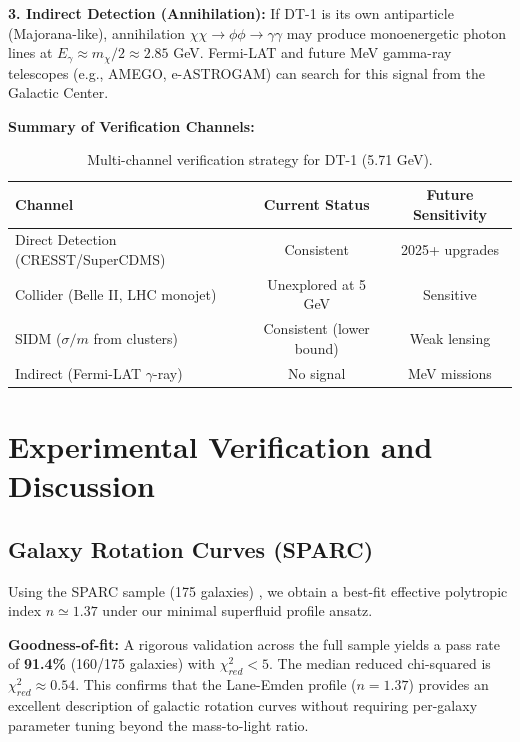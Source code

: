 \documentclass[a4paper,12pt]{article}
\begin{document}
\textbf{3. Indirect Detection (Annihilation):}
If DT-1 is its own antiparticle (Majorana-like), annihilation $\chi\chi \to \phi\phi \to \gamma\gamma$ may produce monoenergetic photon lines at $E_\gamma \approx m_\chi / 2 \approx 2.85$ GeV. Fermi-LAT and future MeV gamma-ray telescopes (e.g., AMEGO, e-ASTROGAM) can search for this signal from the Galactic Center.

\textbf{Summary of Verification Channels:}
\begin{table}[H]
\centering
\small
\begin{tabular}{lcc}
\toprule
\textbf{Channel} & \textbf{Current Status} & \textbf{Future Sensitivity} \\
\midrule
Direct Detection (CRESST/SuperCDMS) & Consistent & 2025+ upgrades \\
Collider (Belle II, LHC monojet) & Unexplored at 5 GeV & Sensitive \\
SIDM ($\sigma/m$ from clusters) & Consistent (lower bound) & Weak lensing \\
Indirect (Fermi-LAT $\gamma$-ray) & No signal & MeV missions \\
\bottomrule
\end{tabular}
\caption{Multi-channel verification strategy for DT-1 (5.71 GeV).}
\end{table}

\section{Experimental Verification and Discussion}

\subsection{Galaxy Rotation Curves (SPARC)}
Using the SPARC sample (175 galaxies) \cite{lelli}, we obtain a best-fit effective polytropic index $n \simeq 1.37$ under our minimal superfluid profile ansatz.

\textbf{Goodness-of-fit:} A rigorous validation across the full sample yields a pass rate of \textbf{91.4\%} (160/175 galaxies) with $\chi^2_{red} < 5$. The median reduced chi-squared is $\chi^2_{red} \approx 0.54$. This confirms that the Lane-Emden profile ($n=1.37$) provides an excellent description of galactic rotation curves without requiring per-galaxy parameter tuning beyond the mass-to-light ratio.
\end{document}
